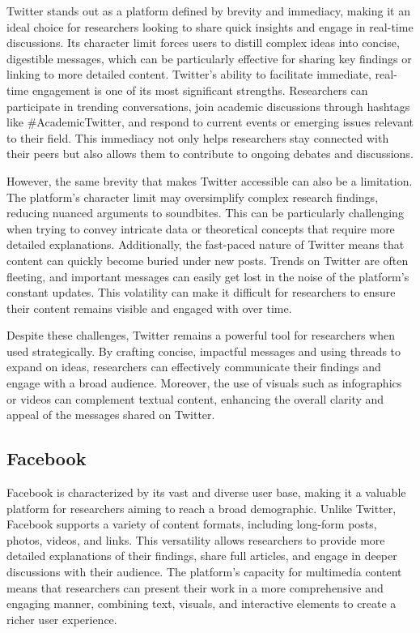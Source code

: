 \documentclass[
]{book}
\begin{document}
Twitter stands out as a platform defined by brevity and immediacy, making it an ideal choice for researchers looking to share quick insights and engage in real-time discussions. Its character limit forces users to distill complex ideas into concise, digestible messages, which can be particularly effective for sharing key findings or linking to more detailed content. Twitter's ability to facilitate immediate, real-time engagement is one of its most significant strengths. Researchers can participate in trending conversations, join academic discussions through hashtags like \#AcademicTwitter, and respond to current events or emerging issues relevant to their field. This immediacy not only helps researchers stay connected with their peers but also allows them to contribute to ongoing debates and discussions.

However, the same brevity that makes Twitter accessible can also be a limitation. The platform's character limit may oversimplify complex research findings, reducing nuanced arguments to soundbites. This can be particularly challenging when trying to convey intricate data or theoretical concepts that require more detailed explanations. Additionally, the fast-paced nature of Twitter means that content can quickly become buried under new posts. Trends on Twitter are often fleeting, and important messages can easily get lost in the noise of the platform's constant updates. This volatility can make it difficult for researchers to ensure their content remains visible and engaged with over time.

Despite these challenges, Twitter remains a powerful tool for researchers when used strategically. By crafting concise, impactful messages and using threads to expand on ideas, researchers can effectively communicate their findings and engage with a broad audience. Moreover, the use of visuals such as infographics or videos can complement textual content, enhancing the overall clarity and appeal of the messages shared on Twitter.

\subsection*{Facebook}\label{facebook}

Facebook is characterized by its vast and diverse user base, making it a valuable platform for researchers aiming to reach a broad demographic. Unlike Twitter, Facebook supports a variety of content formats, including long-form posts, photos, videos, and links. This versatility allows researchers to provide more detailed explanations of their findings, share full articles, and engage in deeper discussions with their audience. The platform's capacity for multimedia content means that researchers can present their work in a more comprehensive and engaging manner, combining text, visuals, and interactive elements to create a richer user experience.
\end{document}
